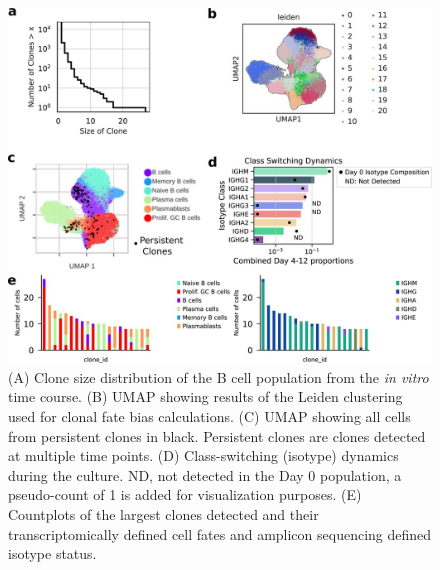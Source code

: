 \begin{figure}[hbt!]
\centering
\includegraphics[width=14cm, keepaspectratio]{figs/paper2/figs3_bcd.jpg}
\caption[Clonal analysis of cell identity outcomes.]{(A) Clone size distribution of the B cell population from the \textit{in vitro} time course. (B) UMAP showing results of the Leiden clustering used for clonal fate bias calculations. (C) UMAP showing all cells from persistent clones in black. Persistent clones are clones detected at multiple time points. (D) Class-switching (isotype) dynamics during the culture. ND, not detected in the Day 0 population, a pseudo-count of 1 is added for visualization purposes. (E) Countplots of the largest clones detected and their transcriptomically defined cell fates and amplicon sequencing defined isotype status.}
\label{fig:paper2_fig_s3}
\end{figure}


